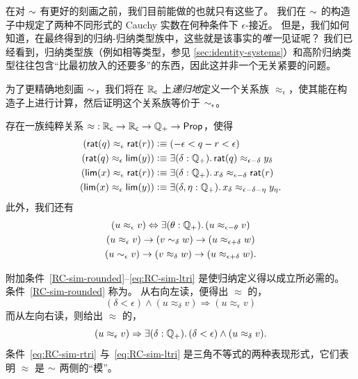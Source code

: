 在对 $\mathord\sim$ 有更好的刻画之前，我们目前能做的也就只有这些了。
我们在 $\mathord\sim$ 的构造子中规定了两种不同形式的 Cauchy 实数在何种条件下 $\epsilon$-接近。
但是，我们如何知道，在最终得到的归纳-归纳类型族中，这些就是该事实的\emph{唯一}见证呢？
我们已经看到，归纳类型族（例如相等类型，参见 \cref{sec:identity-systems}）和高阶归纳类型往往包含“比最初放入的还要多”的东西，因此这并非一个无关紧要的问题。

为了更精确地刻画 $\mathord\sim$，我们将在 $\mathbb{R}_\mathsf{c}$ 上\emph{递归地}定义一个关系族 $\approx_\epsilon$，使其能在构造子上进行计算，然后证明这个关系族等价于 $\sim_{\epsilon}$。

\begin{thm}\label{defn:RC-approx}
  存在一族纯粹关系 $\mathord\approx:\mathbb{R}_\mathsf{c}\to\mathbb{R}_\mathsf{c}\to\mathbb{Q}_{+}\to\mathsf{Prop}$，使得
  \begin{align}
    (\rcrat(q) \approx_\epsilon \rcrat(r))  &\defeq
    (-\epsilon < q - r < \epsilon)\label{eq:RCappx1}\\
    (\rcrat(q) \approx_\epsilon \rclim(y)) &\defeq
    \exis{\delta : \Qp} \rcrat(q) \approx_{\epsilon - \delta} y_\delta\label{eq:RCappx2}\\
    (\rclim(x) \approx_\epsilon \rcrat(r)) &\defeq
    \exis{\delta : \Qp} x_\delta \approx_{\epsilon - \delta} \rcrat(r)\label{eq:RCappx3}\\
    (\rclim(x) \approx_\epsilon \rclim(y)) &\defeq
    \exis{\delta, \eta : \Qp} x_\delta \approx_{\epsilon - \delta - \eta} y_\eta.\label{eq:RCappx4}
  \end{align}
  此外，我们还有
  \begin{gather}
    (u \approx_\epsilon v) \Leftrightarrow \exis{\theta:\Qp} (u \approx_{\epsilon-\theta} v) \label{RC-sim-rounded}\\
    (u \approx_\epsilon v) \to (v\close\delta w) \to (u\approx_{\epsilon+\delta} w)\label{eq:RC-sim-rtri}\\
    (u \close\epsilon v) \to (v\approx_\delta w) \to (u\approx_{\epsilon+\delta} w)\label{eq:RC-sim-ltri}.
  \end{gather}
\end{thm}

附加条件~\eqref{RC-sim-rounded}--\eqref{eq:RC-sim-ltri} 是使归纳定义得以成立所必需的。
条件~\eqref{RC-sim-rounded} 称为。
%
%
从右向左读，便得出 $\approx$ 的，
%
%
%
\begin{equation*}
  (\delta < \epsilon) \land (u \approx_\delta v) \Rightarrow (u \approx_\epsilon v)
\end{equation*}
%
而从左向右读，则给出 $\approx$ 的，
%
%
%
\begin{equation*}
  (u \approx_\epsilon v) \Rightarrow \exis{\delta : \Qp} (\delta < \epsilon) \land (u \approx_\delta v).
\end{equation*}
%
条件~\eqref{eq:RC-sim-rtri} 与~\eqref{eq:RC-sim-ltri} 是三角不等式的两种表现形式，它们表明 $\approx$ 是 $\mathord\sim$ 两侧的``模''。

